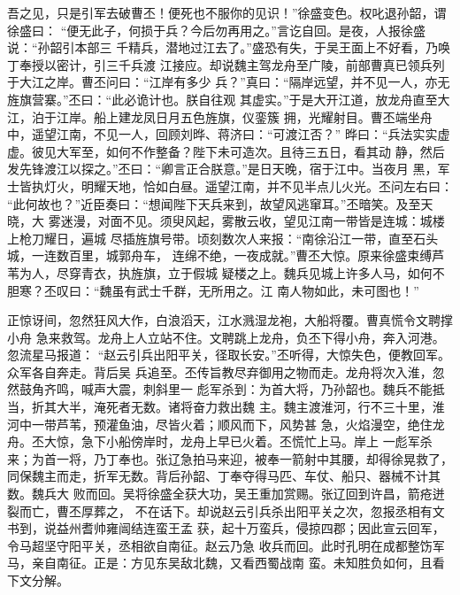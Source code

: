 吾之见，只是引军去破曹丕！便死也不服你的见识！”徐盛变色。权叱退孙韶，谓徐盛曰：
“便无此子，何损于兵？今后勿再用之。”言讫自回。是夜，人报徐盛说：“孙韶引本部三
千精兵，潜地过江去了。”盛恐有失，于吴王面上不好看，乃唤丁奉授以密计，引三千兵渡
江接应。却说魏主驾龙舟至广陵，前部曹真已领兵列于大江之岸。曹丕问曰：“江岸有多少
兵？”真曰：“隔岸远望，并不见一人，亦无旌旗营寨。”丕曰：“此必诡计也。朕自往观
其虚实。”于是大开江道，放龙舟直至大江，泊于江岸。船上建龙凤日月五色旌旗，仪銮簇
拥，光耀射目。曹丕端坐舟中，遥望江南，不见一人，回顾刘晔、蒋济曰：“可渡江否？”
晔曰：“兵法实实虚虚。彼见大军至，如何不作整备？陛下未可造次。且待三五日，看其动
静，然后发先锋渡江以探之。”丕曰：“卿言正合朕意。”是日天晚，宿于江中。当夜月
黑，军士皆执灯火，明耀天地，恰如白昼。遥望江南，并不见半点儿火光。丕问左右曰：
“此何故也？”近臣奏曰：“想闻陛下天兵来到，故望风逃窜耳。”丕暗笑。及至天晓，大
雾迷漫，对面不见。须臾风起，雾散云收，望见江南一带皆是连城：城楼上枪刀耀日，遍城
尽插旌旗号带。顷刻数次人来报：“南徐沿江一带，直至石头城，一连数百里，城郭舟车，
连绵不绝，一夜成就。”曹丕大惊。原来徐盛束缚芦苇为人，尽穿青衣，执旌旗，立于假城
疑楼之上。魏兵见城上许多人马，如何不胆寒？丕叹曰：“魏虽有武士千群，无所用之。江
南人物如此，未可图也！”

正惊讶间，忽然狂风大作，白浪滔天，江水溅湿龙袍，大船将覆。曹真慌令文聘撑小舟
急来救驾。龙舟上人立站不住。文聘跳上龙舟，负丕下得小舟，奔入河港。忽流星马报道：
“赵云引兵出阳平关，径取长安。”丕听得，大惊失色，便教回军。众军各自奔走。背后吴
兵追至。丕传旨教尽弃御用之物而走。龙舟将次入淮，忽然鼓角齐鸣，喊声大震，刺斜里一
彪军杀到：为首大将，乃孙韶也。魏兵不能抵当，折其大半，淹死者无数。诸将奋力救出魏
主。魏主渡淮河，行不三十里，淮河中一带芦苇，预灌鱼油，尽皆火着；顺风而下，风势甚
急，火焰漫空，绝住龙舟。丕大惊，急下小船傍岸时，龙舟上早已火着。丕慌忙上马。岸上
一彪军杀来；为首一将，乃丁奉也。张辽急拍马来迎，被奉一箭射中其腰，却得徐晃救了，
同保魏主而走，折军无数。背后孙韶、丁奉夺得马匹、车仗、船只、器械不计其数。魏兵大
败而回。吴将徐盛全获大功，吴王重加赏赐。张辽回到许昌，箭疮迸裂而亡，曹丕厚葬之，
不在话下。却说赵云引兵杀出阳平关之次，忽报丞相有文书到，说益州耆帅雍闿结连蛮王孟
获，起十万蛮兵，侵掠四郡；因此宣云回军，令马超坚守阳平关，丞相欲自南征。赵云乃急
收兵而回。此时孔明在成都整饬军马，亲自南征。正是：方见东吴敌北魏，又看西蜀战南
蛮。未知胜负如何，且看下文分解。